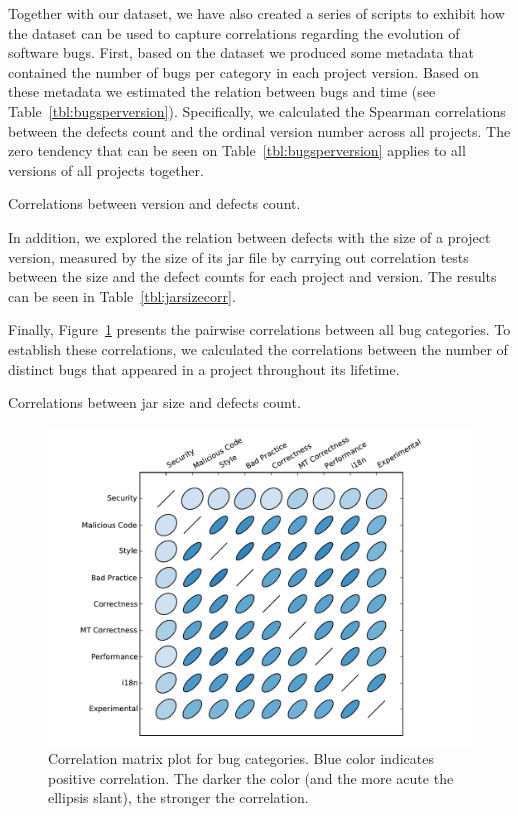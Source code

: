 \documentclass{sig-alternate}
\begin{document}
Together with our dataset, we have also created a series of
scripts to exhibit how the dataset can be used
to capture correlations regarding
the evolution of software bugs.
First, based on the dataset we produced some metadata
that contained the number of
bugs per category in each project version. Based
on these metadata we estimated the relation between
bugs and time (see Table~\ref{tbl:bugsperversion}).
Specifically, we calculated the Spearman correlations between the defects
count and the ordinal version number across all projects.
The zero tendency that can be seen on Table~\ref{tbl:bugsperversion}
applies to all versions of all projects together.

\begin{table}[tphp]
    \centering
        
	\caption{Correlations between version and defects count.}
    \label{tbl:bugsperversion}
\end{table}

In addition, we explored the relation between defects
with the size of a project
version, measured by the size of its {\sc jar} file by carrying out
correlation tests between the size and the defect counts for each
project and version. The results can be seen in
Table~\ref{tbl:jarsizecorr}.

Finally, Figure~\ref{fig:corrplot} presents the pairwise correlations
between all bug categories. To establish these correlations,
we calculated the correlations between the number of
distinct bugs that appeared in a project throughout its lifetime.

\begin{table}[hbt]
    \centering
    
    \caption{Correlations between {\sc jar} size and defects count.}
    \label{tbl:jarsizecorr}
\end{table}


\begin{figure}
  \centering
  \includegraphics[scale=0.43]{corrplot.pdf}
  \caption{Correlation matrix plot for bug categories.
Blue color indicates positive correlation.
The darker the color (and the more acute the ellipsis slant),
the stronger the correlation.}
  \label{fig:corrplot}
\end{figure}
\end{document}
